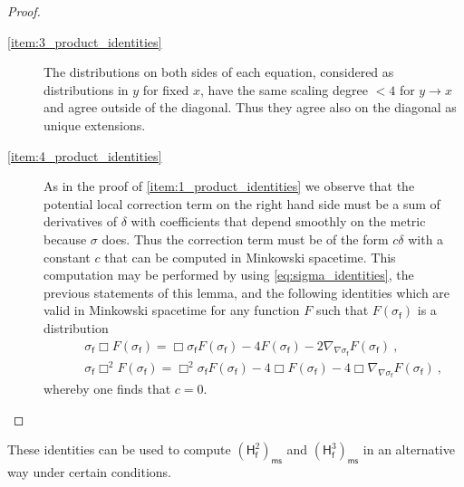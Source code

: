 \documentclass[11pt]{book}
\newcommand{\ms}{\mathsf{ms}}
\newcommand{\Hsf}{\mathsf{H}}
\newcommand{\fsf}{\mathsf{f}}
\theoremstyle{break}
\begin{document}
\begin{proof}
\begin{description}
\item[\ref{item:3_product_identities}]The distributions on both sides of each equation, considered as distributions in $y$ for fixed $x$, have the same scaling degree $<4$ for $y\to x$ and agree outside of the diagonal. Thus they agree also on the diagonal as unique extensions.

\item[\ref{item:4_product_identities}] As in the proof of \ref{item:1_product_identities} we observe that the potential local correction term on the right hand side must be a sum of derivatives of $\delta$ with coefficients that depend smoothly on the metric because $\sigma$ does. Thus the correction term must be of the form $c\delta$ with a constant $c$ that can be computed in Minkowski spacetime. This computation may be performed by using \eqref{eq:sigma_identities}, the previous statements of this lemma, and the following identities which are valid in Minkowski spacetime for any function $F$ such that $F(\sigma_\fsf)$ is a distribution
%
\begin{eqnarray}
&& \sigma_\fsf\Box  F(\sigma_\fsf)=\Box \sigma_\fsf F(\sigma_\fsf) - 4 F(\sigma_\fsf) - 2\nabla_{\nabla\sigma_\fsf}F(\sigma_\fsf) \ , \\
&& \sigma_\fsf\Box^2  F(\sigma_\fsf)=\Box^2 \sigma_\fsf F(\sigma_\fsf) - 4 \Box F(\sigma_\fsf) - 4\Box \nabla_{\nabla\sigma_\fsf}F(\sigma_\fsf) \ ,
\end{eqnarray}
%
whereby one finds that $c=0$.
\end{description}
\end{proof}


These identities can be used to compute $\left(\Hsf_\fsf^2\right)_\ms$ and $\left(\Hsf_\fsf^3\right)_\ms$ in an alternative way under certain conditions.
\end{document}

